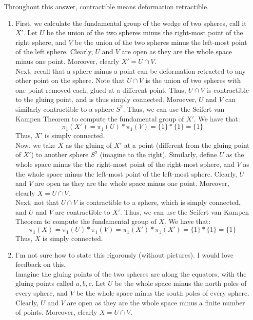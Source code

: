 \documentclass[12pt]{article}
\begin{document}
\begin{solu}
    Throughout this answer, contractible means deformation retractible. 
    \begin{enumerate}
        \item First, we calculate the fundamental group of the wedge of two spheres, call it $X'$. Let $U$ be the union of the two spheres minus the right-most point of the right sphere, and $V$ be the union of the two spheres minus the left-most point of the left sphere. Clearly, $U$ and $V$ are open as they are the whole space minus one point. Moreover, clearly $X' = U \cap V$. \\ 
        Next, recall that a sphere minus a point can be deformation retracted to any other point on the sphere. Note that $U \cap V$ is the union of two spheres with one point removed each, glued at a different point. Thus, $U \cap V$ is contractible to the gluing point, and is thus simply connected. Moroever, $U$ and $V$ can similarly contractible to a sphere $S^2$. Thus, we can use the Seifert van Kampen Theorem to compute the fundamental group of $X'$. We have that: 
        \[  \pi_1(X') = \pi_1(U) * \pi_1(V) = \{1\} * \{1\} = \{1\}\]
        Thus, $X'$ is simply connected. \\
        Now, we take $X$ as the gluing of $X'$ at a point (different from the gluing point of $X'$) to another sphere $S^2$ (imagine to the right). Similarly, define $U$ as the whole space minus the the right-most point of the right-most sphere, and $V$ as the whole space minus the left-most point of the left-most sphere. Clearly, $U$ and $V$ are open as they are the whole space minus one point. Moreover, clearly $X = U \cap V$. \\
        Next, not that $U \cap V$ is contractible to a sphere, which is simply connected, and $U$ and $V$ are contractible to $X'$. Thus, we can use the Seifert van Kampen Theorem to compute the fundamental group of $X$. We have that:
        \[  \pi_1(X) = \pi_1(U) * \pi_1(V) = \pi_1(X') * \pi_1(X') = \{1\} * \{1\} = \{1\}\]
        Thus, $X$ is simply connected.
        \item I'm not sure how to state this rigorously (without pictures). I would love feedback on this. \\
        Imagine the gluing points of the two spheres are along the equators, with the gluing points called $a, b, c$. Let $U$ be the whole space minus the north poles of every sphere, and $V$ be the whole space minus the south poles of every sphere. Clearly, $U$ and $V$ are open as they are the whole space minus a finite number of points. Moreover, clearly $X = U \cap V$. \bbni

\end{enumerate}
\end{solu}
\end{document}
